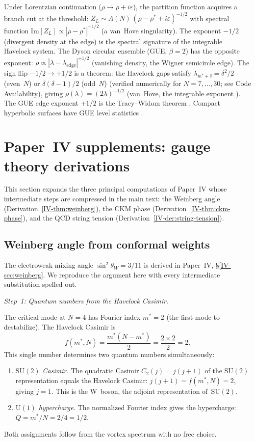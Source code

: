 Under Lorentzian continuation ($\rho \to \rho + i\varepsilon$),
the partition function acquires a branch cut at the threshold:
$Z_L \sim A(N)\,({\rho - \rho^* + i\varepsilon})^{-1/2}$
with spectral function $\mathrm{Im}[Z_L] \propto |\rho - \rho^*|^{-1/2}$
(a van~Hove singularity).
The exponent $-1/2$ (divergent density at the edge) is the
spectral signature of the integrable Havelock system.
The Dyson circular ensemble (GUE, $\beta = 2$) has the
opposite exponent: $\rho \propto |\lambda - \lambda_{\mathrm{edge}}|^{+1/2}$
(vanishing density, the Wigner semicircle edge).
The sign flip $-1/2 \to +1/2$ is a theorem:
the Havelock gaps satisfy $\lambda_{m^*+\delta} = \delta^2/2$
(even~$N$) or $\delta(\delta{-}1)/2$ (odd~$N$)
(verified numerically for
$N = 7,\ldots,30$; see Code Availability), giving $\rho(\lambda) = (2\lambda)^{-1/2}$
(van~Hove, the integrable exponent \citep{BerryTabor1977}).
The GUE edge exponent $+1/2$ is the Tracy--Widom theorem
\citep{TracyWidom1994}.
Compact hyperbolic surfaces have GUE level statistics
\citep{AurichSteiner1993}.


\section{Paper~IV supplements: gauge theory derivations}
\label{sec:gauge-supplements}

This section expands the three principal computations of Paper~IV
whose intermediate steps are compressed in the main text:
the Weinberg angle (Derivation~\ref*{IV-thm:weinberg}),
the CKM phase (Derivation~\ref*{IV-thm:ckm-phase}),
and the QCD string tension (Derivation~\ref*{IV-der:string-tension}).

\subsection{Weinberg angle from conformal weights}
\label{sec:supp-weinberg}

The electroweak mixing angle $\sin^2\theta_W = 3/11$ is derived
in Paper~IV, \S\ref*{IV-sec:weinberg}.
We reproduce the argument here with every intermediate
substitution spelled out.

\medskip\noindent
\emph{Step~1: Quantum numbers from the Havelock Casimir.}

The critical mode at $N = 4$ has Fourier index $m^* = 2$
(the first mode to destabilize).
The Havelock Casimir is
\[
  f(m^*, N) = \frac{m^*(N - m^*)}{2}
  = \frac{2 \times 2}{2} = 2.
\]
This single number determines two quantum numbers simultaneously:
\begin{enumerate}
\item \emph{$\mathrm{SU}(2)$ Casimir.}
  The quadratic Casimir $C_2(j) = j(j+1)$ of the
  $\mathrm{SU}(2)$ representation equals the Havelock Casimir:
  $j(j+1) = f(m^*, N) = 2$, giving $j = 1$.
  This is the W~boson, the adjoint representation
  of~$\mathrm{SU}(2)$.
\item \emph{$\mathrm{U}(1)$ hypercharge.}
  The normalized Fourier index gives the hypercharge:
  $Q = m^*/N = 2/4 = 1/2$.
\end{enumerate}
Both assignments follow from the vortex spectrum with no free choice.

